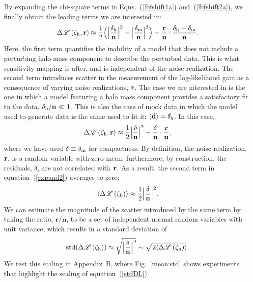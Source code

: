 \documentclass[a4paper, fleqn, usenatbib, useAMS]{mnras}
\def\zh{\zeta_{\rm h}}
\def\DL{\Delta\mathscr{L}}
\begin{document}
By expanding the chi-square
terms in Eqns.~(\ref{lbfshift1a}) and~(\ref{lbfshift2a}), we
finally obtain the leading terms we are interested in:
%
\begin{equation}
\DL \left( \bf\zh, \textbf{r} \right) \approx {1\over 2} \Big(\Big|{\delta_{\rm h}\over{\bf n}} \Big|^2 - \Big|{\delta_{\rm m}\over{\bf n}} \Big|^2\Big) + {{\textbf{r}}\over{\textbf{n}}}\cdot{{\delta_{\rm h}-\delta_{\rm m}}\over{\textbf{n}}}.
\label{expandall}
\end{equation}
%
Here, the first term quantifies the inability of a model that does not include a perturbing halo mass component
to describe the perturbed data. This is what sensitivity mapping is after, and  is independent of the noise realization. 
The second term introduces scatter in the measurement of 
the log-likelihood gain as a consequence of varying noise realizations, $\bf r$. The case we are interested in 
is the one in which a model featuring a halo mass component provides a
satisfactory fit to the data,  
$\delta_{\rm h}/\textbf{n}\ll 1$. This is also the case of mock data in which 
the model used to generate data is the same used to fit it: $\langle
\bf d\rangle = \bf f_{\rm h}$. In this case,  
%
\begin{equation}
\DL \left( \bf\zh, \textbf{r} \right) \approx {1\over 2} \Big|{\delta\over{\bf n}} \Big|^2 + {{\delta}\over{\textbf{n}}}\cdot{{\textbf{r}}\over{\textbf{n}}},
\label{expand2}
\end{equation}
%
where we have used $\delta\equiv\delta_{\rm m}$ for compactness.
By definition, the noise realization, $\bf r$, is a random variable with zero mean; furthermore,
by construction, the residuals,
$\delta$, are not correlated with $\bf r$. As a result, the second term in equation~(\ref{expand2}) averages to zero:
%
\begin{equation}
\langle\DL \left( \bf\zh \right)\rangle \approx {1\over 2} \Big|{\delta\over{\bf n}} \Big|^2.
\label{meanDL}
\end{equation}
%
We can estimate the magnitude of the scatter introduced by the same term by taking the ratio, $\textbf{r}/\textbf{n}$, to be a set of independent normal random variables with unit variance, which results in a standard deviation of
%
\begin{equation}
{\rm std}(\DL \left( \bf\zh \right)) \approx{} \sqrt{\Big|{\delta\over{\bf n}} \Big|^2} \sim \sqrt{2\langle\DL \left( \bf\zh \right)\rangle}.
\label{stdDL}
\end{equation}
We test this scaling in Appendix~B, where Fig.~\ref{mean:std} shows experiments that highlight the scaling of equation~(\ref{stdDL}).    
\end{document}

